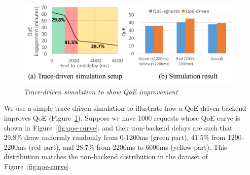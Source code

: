 \begin{figure}
	\centering
	\vspace{-0.4cm}
	\includegraphics[width=1.0\textwidth]{figs/simulation.pdf}
	\vspace{-1.cm}
	\caption{\em Trace-driven simulation to show QoE improvement}
	\label{fig:simulation}
\end{figure}
We use a simple trace-driven simulation to illustrate how a QoE-driven backend improves QoE (Figure~\ref{fig:simulation}).
Suppose we have 1000 requests whose QoE curve is shown in Figure~\ref{fig:qoe-curve}, and their non-backend delays are such that 29.8\% draw uniformly randomly from 0-1200ms (green part), 41.5\% from 1200-2200ms (red part), and 28.7\% from 2200ms to 6000ms (yellow part). This distribution matches the non-backend distribution in the dataset of Figure~\ref{fig:qoe-curve}.
